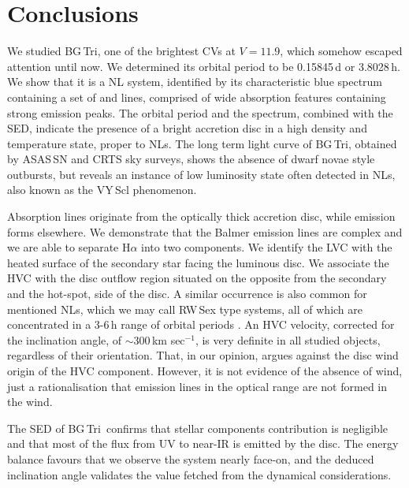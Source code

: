 \documentclass[fleqn,usenatbib]{mnras}
\def\bg{BG\,Tri}
\def\grad{$^\circ$}
\begin{document}
    
   





\section{Conclusions}
\label{sec:conclusions}

We studied \bg, one of the brightest CVs at $V=11.9$, which somehow escaped attention until now. We determined its orbital period to be
0.15845\,d or 3.8028\,h.  We show that it is a  NL system, identified by its characteristic blue spectrum containing a set of  and
 lines, comprised of wide absorption features containing strong emission peaks. The orbital period and the spectrum, combined with
the SED, indicate the presence of a bright accretion disc in a high density and temperature state, proper to NLs. The long term light curve of
\bg, obtained by ASAS\,SN and CRTS sky surveys, shows the absence of dwarf novae style outbursts, but reveals an instance of low luminosity
state often detected in NLs, also known as the VY\,Scl phenomenon.

 Absorption lines originate from the optically thick accretion disc, while emission forms elsewhere.  We demonstrate that the Balmer emission
lines are complex and we are able to separate H$\alpha$ into two components.       
We identify the LVC with the heated surface of the secondary star facing the luminous disc. 
We associate the HVC  with the disc outflow region situated on the opposite from the
secondary and the hot-spot, side of the disc. A similar occurrence is also common for mentioned NLs, which we may call RW\,Sex type systems, all of which are concentrated in a 3-6\,h range of orbital periods \citep{Subebekova20}. 
An HVC velocity, corrected for the inclination angle, of $\sim$300\,km sec$^{-1}$, is very definite in all studied objects, regardless of their
orientation. That, in our opinion, argues against the disc wind origin of the HVC component. However, it is not evidence of the absence of wind,
just a rationalisation that emission lines in the optical range are not formed in the wind.

The SED of \bg\ confirms that stellar components contribution is negligible and that most of the flux from UV to  near-IR is emitted by the
disc. The energy balance favours  that we observe the system nearly face-on, and the deduced inclination angle validates the value fetched
from the dynamical considerations.  
\end{document}
